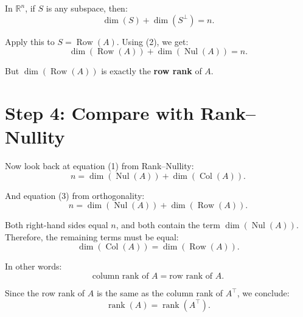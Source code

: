 \documentclass[11pt]{article}
\begin{document}
In $ \mathbb{R}^n $, if $ S $ is any subspace, then:
\[
\dim(S) + \dim(S^\perp) = n.
\]

Apply this to $ S = \operatorname{Row}(A) $. Using (2), we get:
\[
\dim(\operatorname{Row}(A)) + \dim(\operatorname{Nul}(A)) = n.
\tag{3}
\]

But $ \dim(\operatorname{Row}(A)) $ is exactly the \textbf{row rank} of $ A $.

\section*{Step 4: Compare with Rank--Nullity}

Now look back at equation (1) from Rank--Nullity:
\[
n = \dim(\operatorname{Nul}(A)) + \dim(\operatorname{Col}(A)).
\]

And equation (3) from orthogonality:
\[
n = \dim(\operatorname{Nul}(A)) + \dim(\operatorname{Row}(A)).
\]

Both right-hand sides equal $ n $, and both contain the term $ \dim(\operatorname{Nul}(A)) $.  
Therefore, the remaining terms must be equal:
\[
\dim(\operatorname{Col}(A)) = \dim(\operatorname{Row}(A)).
\]

In other words:
\[
\text{column rank of } A = \text{row rank of } A.
\]

Since the row rank of $ A $ is the same as the column rank of $ A^\top $, we conclude:
\[
\operatorname{rank}(A) = \operatorname{rank}(A^\top).
\]





















\newpage
\end{document}
